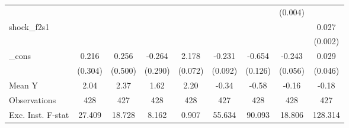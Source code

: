 {\begin{tabular}{l*{8}{c}}
            &                     &                     &                     &                     &                     &                     &     (0.004)         &                     \\
\addlinespace
shock\_f2s1  &                     &                     &                     &                     &                     &                     &                     &       0.027\sym{***}\\
            &                     &                     &                     &                     &                     &                     &                     &     (0.002)         \\
\addlinespace
\_cons      &       0.216         &       0.256         &      -0.264         &       2.178\sym{***}&      -0.231\sym{**} &      -0.654\sym{***}&      -0.243\sym{***}&       0.029         \\
            &     (0.304)         &     (0.500)         &     (0.290)         &     (0.072)         &     (0.092)         &     (0.126)         &     (0.056)         &     (0.046)         \\
\midrule
Mean Y      &        2.04         &        2.37         &        1.62         &        2.20         &       -0.34         &       -0.58         &       -0.16         &       -0.18         \\
Observations&         428         &         427         &         428         &         428         &         427         &         428         &         428         &         427         \\
Exc. Inst. F-stat&      27.409         &      18.728         &       8.162         &       0.907         &      55.634         &      90.093         &      18.806         &     128.314         \\
\bottomrule
\end{tabular}
}
